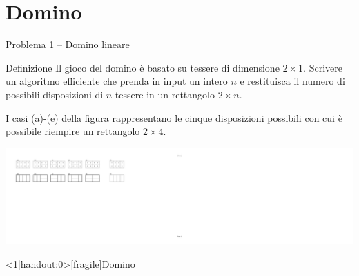 \section{Domino}

\begin{frame}{Problema 1 -- Domino lineare}

\begin{block}{Definizione}
Il gioco del domino è basato su tessere di dimensione $2 \times 1$. Scrivere
un algoritmo efficiente che prenda in input un intero $n$ e restituisca il numero di possibili disposizioni di $n$ tessere in un rettangolo $2 \times n$.
\end{block}

\bigskip
{}

I casi (a)-(e) della figura rappresentano le cinque disposizioni possibili con cui è possibile riempire un rettangolo $2 \times 4$. 

\begin{center}
\includegraphics[width=1.0\textwidth]{domino.pdf}
\end{center}

\end{frame}


\begin{frame}<1|handout:0>[fragile]{Domino}

\bigskip
{}

\end{frame}

